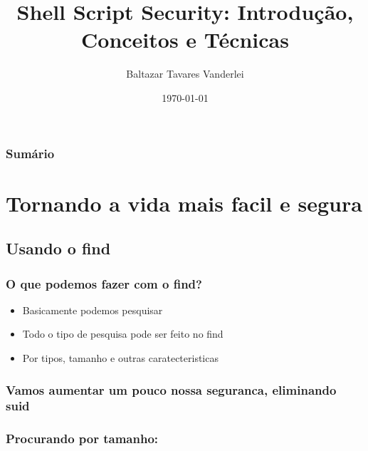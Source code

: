 \documentclass[10pt]{beamer}
\title[]{Shell Script Security: Introdução, Conceitos e Técnicas}
\author[]{Baltazar Tavares Vanderlei}
\date{\today}
\institute[2012]{Laboratório de Computação Científica e Visualização - LCCV/UFAL}
\begin{document}
\newcommand{\til}{\~{}}

\frame{\titlepage}
	\begin{frame}[t]
	\frametitle{Sumário}
	\tableofcontents[framebreaks]
\end{frame}



%
%
%


\section{Tornando a vida mais facil e segura}
	\subsection{Usando o find}
		\begin{frame}%
		\frametitle{O que podemos fazer com o find?}
			\begin{itemize}[<+->]
				\item Basicamente podemos pesquisar
				\item Todo o tipo de pesquisa pode ser feito no find
				\item Por tipos, tamanho e outras caratecteristicas
			\end{itemize}
		\end{frame}

		\begin{frame}%
		\frametitle{Vamos aumentar um pouco nossa seguranca, eliminando suid}
			
		\end{frame}

		\begin{frame}%
		\frametitle{Procurando por tamanho:}
			
		\end{frame}
\end{document}
